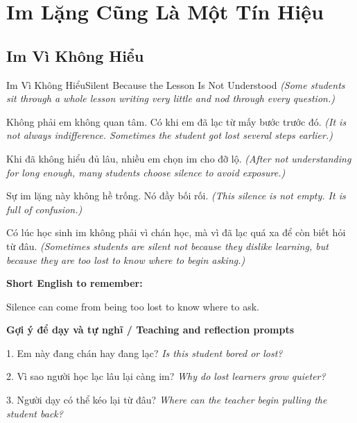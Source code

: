 \chapter{Im Lặng Cũng Là Một Tín Hiệu}

\section{Im Vì Không Hiểu}
\begin{truyen}{Im Vì Không Hiểu}{Silent Because the Lesson Is Not Understood}
\textit{(Some students sit through a whole lesson writing very little and nod through every question.)}

Không phải em không quan tâm. Có khi em đã lạc từ mấy bước trước đó.
\textit{(It is not always indifference. Sometimes the student got lost several steps earlier.)}

Khi đã không hiểu đủ lâu, nhiều em chọn im cho đỡ lộ.
\textit{(After not understanding for long enough, many students choose silence to avoid exposure.)}

Sự im lặng này không hề trống. Nó đầy bối rối.
\textit{(This silence is not empty. It is full of confusion.)}

\end{truyen}

\begin{baihoc}
Có lúc học sinh im không phải vì chán học, mà vì đã lạc quá xa để còn biết hỏi từ đâu.
\textit{(Sometimes students are silent not because they dislike learning, but because they are too lost to know where to begin asking.)}
\end{baihoc}

\begin{ghinhoanh}
\textbf{Short English to remember:}

Silence can come from being too lost to know where to ask.

\end{ghinhoanh}

\begin{tuhocnhanh}
\textbf{Gợi ý để dạy và tự nghĩ / Teaching and reflection prompts}

1. Em này đang chán hay đang lạc? \textit{Is this student bored or lost?}

2. Vì sao người học lạc lâu lại càng im? \textit{Why do lost learners grow quieter?}

3. Người dạy có thể kéo lại từ đâu? \textit{Where can the teacher begin pulling the student back?}
\end{tuhocnhanh}
\ngancach

